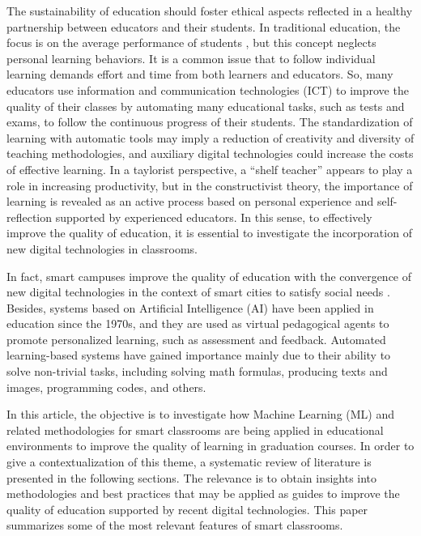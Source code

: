 \documentclass[english]{textolivre}
\begin{document}
The sustainability of education should foster ethical aspects reflected
in a healthy partnership between educators and their students. In
traditional education, the focus is on the average performance of
students \cite{Luan2021}, but this concept neglects personal learning
behaviors. It is a common issue that to follow individual learning
demands effort and time from both learners and educators. So, many
educators use information and communication technologies (ICT) to
improve the quality of their classes by automating many educational
tasks, such as tests and exams, to follow the continuous progress of
their students. The standardization of learning with automatic
tools may imply a reduction of creativity and diversity of
teaching methodologies, and auxiliary digital technologies could
increase the costs of effective learning. In a taylorist perspective, a
``shelf teacher'' appears to play a role in increasing productivity, but
in the constructivist theory, the importance of learning is revealed as
an active process based on personal experience and self-reflection
supported by experienced educators. In this sense, to effectively
improve the quality of education, it is essential to investigate the
incorporation of new digital technologies in classrooms.

In fact, smart campuses improve the quality of education with the
convergence of new digital technologies in the context of smart cities
to satisfy social needs \cite{ChamorroAtalaya2023}. Besides, systems
based on Artificial Intelligence (AI) have been applied in education
since the 1970s, and they are used as virtual pedagogical agents to
promote personalized learning, such as assessment and feedback.
Automated learning-based systems have gained importance mainly due to
their ability to solve non-trivial tasks, including solving math
formulas, producing texts and images, programming codes, and others.

In this article, the objective is to investigate how Machine Learning
(ML) and related methodologies for smart classrooms are being applied in
educational environments to improve the quality of learning in
graduation courses. In order to give a contextualization of this theme,
a systematic review of literature is presented in the following
sections. The relevance is to obtain insights into methodologies and
best practices that may be applied as guides to improve the quality of
education supported by recent digital technologies. This paper
summarizes some of the most relevant features of smart classrooms.
\end{document}
